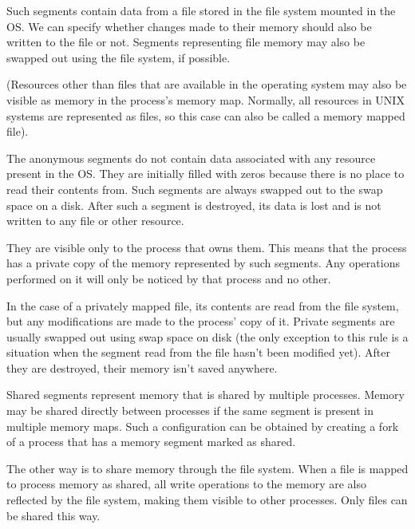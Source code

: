 \begin{description}[style=nextline]
  \item[Memory mapped file segments]
    Such segments contain data from a file stored in the file system mounted in the OS.
    We can specify whether changes made to their memory should also be written to the file or not.
    Segments representing file memory may also be swapped out using the file system, if possible.

    (Resources other than files that are available in the operating system may also be visible as memory in the process's memory map.
    Normally, all resources in UNIX systems are represented as files, so this case can also be called a memory mapped file).

  \item[Anonymous memory segments]
    The anonymous segments do not contain data associated with any resource present in the OS.
    They are initially filled with zeros because there is no place to read their contents from.
    Such segments are always swapped out to the swap space on a disk.
    After such a segment is destroyed, its data is lost and is not written to any file or other resource.

  \item[Private memory segments]
    They are visible only to the process that owns them.
    This means that the process has a private copy of the memory represented by such segments.
    Any operations performed on it will only be noticed by that process and no other.

    In the case of a privately mapped file, its contents are read from the file system,
    but any modifications are made to the process' copy of it.
    Private segments are usually swapped out using swap space on disk
    (the only exception to this rule is a situation when the segment read from the file hasn't been modified yet).
    After they are destroyed, their memory isn't saved anywhere.

  \item[Shared memory segments]
    Shared segments represent memory that is shared by multiple processes.
    Memory may be shared directly between processes if the same segment is present in multiple memory maps.
    Such a configuration can be obtained by creating a fork of a process that has a memory segment marked as shared.

    The other way is to share memory through the file system.
    When a file is mapped to process memory as shared, all write operations to the memory are also reflected by the file system,
    making them visible to other processes.
    Only files can be shared this way.

\end{description}

